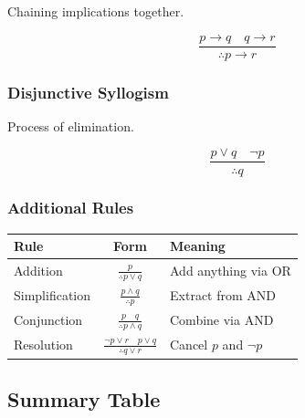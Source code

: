 \documentclass[11pt,a4paper]{article}
\begin{document}
Chaining implications together.

\begin{formulabox}
$$\frac{p \to q \quad q \to r}{\therefore p \to r}$$
\end{formulabox}

\subsubsection{Disjunctive Syllogism}

Process of elimination.

\begin{formulabox}
$$\frac{p \lor q \quad \neg p}{\therefore q}$$
\end{formulabox}

\subsubsection{Additional Rules}

\begin{center}
\begin{tabular}{l|c|l}
\toprule
\textbf{Rule} & \textbf{Form} & \textbf{Meaning} \\
\midrule
Addition & $\frac{p}{\therefore p \lor q}$ & Add anything via OR \\
Simplification & $\frac{p \land q}{\therefore p}$ & Extract from AND \\
Conjunction & $\frac{p \quad q}{\therefore p \land q}$ & Combine via AND \\
Resolution & $\frac{\neg p \lor r \quad p \lor q}{\therefore q \lor r}$ & Cancel $p$ and $\neg p$ \\
\bottomrule
\end{tabular}
\end{center}

\subsection{Summary Table}
\end{document}
